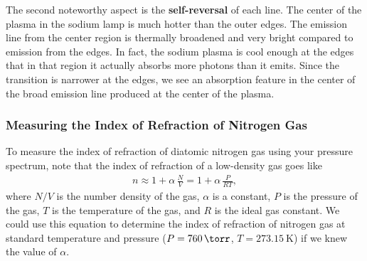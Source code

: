 \documentclass[]{manual}
\begin{document}
    The second noteworthy aspect is the \textbf{self-reversal} of each line.
    The center of the plasma in the sodium lamp is much hotter than the outer edges.
    The emission line from the center region is thermally broadened and very bright compared to emission from the edges.
    In fact, the sodium plasma is cool enough at the edges that in that region it actually absorbs more photons than it emits.
    Since the transition is narrower at the edges, we see an absorption feature in the center of the broad emission line produced at the center of the plasma.


    \subsubsection{Measuring the Index of Refraction of Nitrogen Gas}
    To measure the index of refraction of diatomic nitrogen gas using your pressure spectrum, note that the index of refraction of a low-density gas goes like
    \begin{align} \label{eqn:index-of-refraction}
        n \approx 1 + \alpha \, \frac{N}{V} = 1 + \alpha \, \frac{P}{RT},
    \end{align}
    where $N/V$ is the number density of the gas, $\alpha$ is a constant, $P$ is the pressure of the gas, $T$ is the temperature of the gas, and $R$ is the ideal gas constant.
    We could use this equation to determine the index of refraction of nitrogen gas at standard temperature and pressure ($P = \SI{760}{\torr}$, $T = \SI{273.15}{\kelvin}$) if we knew the value of $\alpha$.

\end{document}
